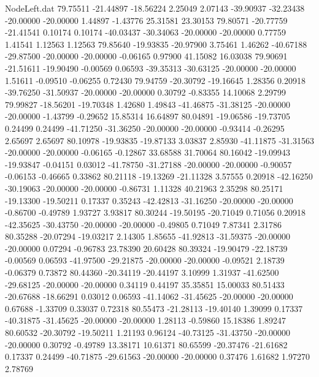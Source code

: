 \begin{filecontents}{NodeLeft.dat}
  79.75511  -21.44897  -18.56224     2.25049    2.07143  -39.90937  -32.23438  -20.00000  -20.00000    1.44897   -1.43776   25.31581   23.30153
  79.80571  -20.77759  -21.41541     0.10174    0.10174  -40.03437  -30.34063  -20.00000  -20.00000    0.77759    1.41541    1.12563    1.12563
  79.85640  -19.93835  -20.97900     3.75461    1.46262  -40.67188  -29.87500  -20.00000  -20.00000   -0.06165    0.97900   41.15082   16.03038
  79.90691  -21.51611  -19.90490    -0.00569    0.06593  -39.35313  -30.63125  -20.00000  -20.00000    1.51611   -0.09510   -0.06255    0.72430
  79.94759  -20.30792  -19.16645     1.28356    0.20918  -39.76250  -31.50937  -20.00000  -20.00000    0.30792   -0.83355   14.10068    2.29799
  79.99827  -18.56201  -19.70348     1.42680    1.49843  -41.46875  -31.38125  -20.00000  -20.00000   -1.43799   -0.29652   15.85314   16.64897
  80.04891  -19.06586  -19.73705     0.24499    0.24499  -41.71250  -31.36250  -20.00000  -20.00000   -0.93414   -0.26295    2.65697    2.65697
  80.10978  -19.93835  -19.87133     3.03837    2.85930  -41.11875  -31.31563  -20.00000  -20.00000   -0.06165   -0.12867   33.68588   31.70064
  80.16042  -19.09943  -19.93847    -0.04151    0.03012  -41.78750  -31.27188  -20.00000  -20.00000   -0.90057   -0.06153   -0.46665    0.33862
  80.21118  -19.13269  -21.11328     3.57555    0.20918  -42.16250  -30.19063  -20.00000  -20.00000   -0.86731    1.11328   40.21963    2.35298
  80.25171  -19.13300  -19.50211     0.17337    0.35243  -42.42813  -31.16250  -20.00000  -20.00000   -0.86700   -0.49789    1.93727    3.93817
  80.30244  -19.50195  -20.71049     0.71056    0.20918  -42.35625  -30.43750  -20.00000  -20.00000   -0.49805    0.71049    7.87341    2.31786
  80.35288  -20.07294  -19.03217     2.14305    1.85655  -41.92813  -31.59375  -20.00000  -20.00000    0.07294   -0.96783   23.78390   20.60428
  80.39324  -19.90479  -22.18739    -0.00569    0.06593  -41.97500  -29.21875  -20.00000  -20.00000   -0.09521    2.18739   -0.06379    0.73872
  80.44360  -20.34119  -20.44197     3.10999    1.31937  -41.62500  -29.68125  -20.00000  -20.00000    0.34119    0.44197   35.35851   15.00033
  80.51433  -20.67688  -18.66291     0.03012    0.06593  -41.14062  -31.45625  -20.00000  -20.00000    0.67688   -1.33709    0.33037    0.72318
  80.55473  -21.28113  -19.40140     1.39099    0.17337  -40.31875  -31.45625  -20.00000  -20.00000    1.28113   -0.59860   15.18386    1.89247
  80.60532  -20.30792  -19.50211     1.21193    0.96124  -40.73125  -31.43750  -20.00000  -20.00000    0.30792   -0.49789   13.38171   10.61371
  80.65599  -20.37476  -21.61682     0.17337    0.24499  -40.71875  -29.61563  -20.00000  -20.00000    0.37476    1.61682    1.97270    2.78769

\end{filecontents}
